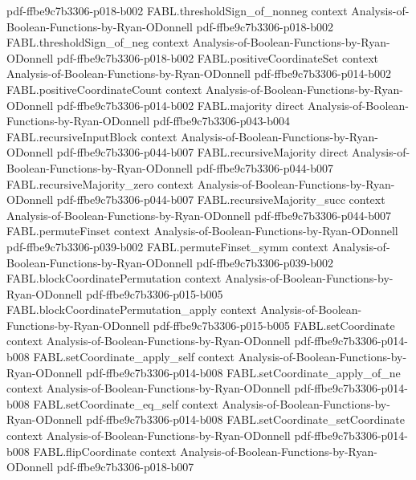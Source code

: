 \begin{theorem}
  {pdf-ffbe9c7b3306-p018-b002}
\proofstep
  {FABL.thresholdSign_of_nonneg}
  {context}
  {Analysis-of-Boolean-Functions-by-Ryan-ODonnell}
  {pdf-ffbe9c7b3306-p018-b002}
\proofstep
  {FABL.thresholdSign_of_neg}
  {context}
  {Analysis-of-Boolean-Functions-by-Ryan-ODonnell}
  {pdf-ffbe9c7b3306-p018-b002}
\proofstep
  {FABL.positiveCoordinateSet}
  {context}
  {Analysis-of-Boolean-Functions-by-Ryan-ODonnell}
  {pdf-ffbe9c7b3306-p014-b002}
\proofstep
  {FABL.positiveCoordinateCount}
  {context}
  {Analysis-of-Boolean-Functions-by-Ryan-ODonnell}
  {pdf-ffbe9c7b3306-p014-b002}
\proofstep
  {FABL.majority}
  {direct}
  {Analysis-of-Boolean-Functions-by-Ryan-ODonnell}
  {pdf-ffbe9c7b3306-p043-b004}
\proofstep
  {FABL.recursiveInputBlock}
  {context}
  {Analysis-of-Boolean-Functions-by-Ryan-ODonnell}
  {pdf-ffbe9c7b3306-p044-b007}
\proofstep
  {FABL.recursiveMajority}
  {direct}
  {Analysis-of-Boolean-Functions-by-Ryan-ODonnell}
  {pdf-ffbe9c7b3306-p044-b007}
\proofstep
  {FABL.recursiveMajority_zero}
  {context}
  {Analysis-of-Boolean-Functions-by-Ryan-ODonnell}
  {pdf-ffbe9c7b3306-p044-b007}
\proofstep
  {FABL.recursiveMajority_succ}
  {context}
  {Analysis-of-Boolean-Functions-by-Ryan-ODonnell}
  {pdf-ffbe9c7b3306-p044-b007}
\proofstep
  {FABL.permuteFinset}
  {context}
  {Analysis-of-Boolean-Functions-by-Ryan-ODonnell}
  {pdf-ffbe9c7b3306-p039-b002}
\proofstep
  {FABL.permuteFinset_symm}
  {context}
  {Analysis-of-Boolean-Functions-by-Ryan-ODonnell}
  {pdf-ffbe9c7b3306-p039-b002}
\proofstep
  {FABL.blockCoordinatePermutation}
  {context}
  {Analysis-of-Boolean-Functions-by-Ryan-ODonnell}
  {pdf-ffbe9c7b3306-p015-b005}
\proofstep
  {FABL.blockCoordinatePermutation_apply}
  {context}
  {Analysis-of-Boolean-Functions-by-Ryan-ODonnell}
  {pdf-ffbe9c7b3306-p015-b005}
\proofstep
  {FABL.setCoordinate}
  {context}
  {Analysis-of-Boolean-Functions-by-Ryan-ODonnell}
  {pdf-ffbe9c7b3306-p014-b008}
\proofstep
  {FABL.setCoordinate_apply_self}
  {context}
  {Analysis-of-Boolean-Functions-by-Ryan-ODonnell}
  {pdf-ffbe9c7b3306-p014-b008}
\proofstep
  {FABL.setCoordinate_apply_of_ne}
  {context}
  {Analysis-of-Boolean-Functions-by-Ryan-ODonnell}
  {pdf-ffbe9c7b3306-p014-b008}
\proofstep
  {FABL.setCoordinate_eq_self}
  {context}
  {Analysis-of-Boolean-Functions-by-Ryan-ODonnell}
  {pdf-ffbe9c7b3306-p014-b008}
\proofstep
  {FABL.setCoordinate_setCoordinate}
  {context}
  {Analysis-of-Boolean-Functions-by-Ryan-ODonnell}
  {pdf-ffbe9c7b3306-p014-b008}
\proofstep
  {FABL.flipCoordinate}
  {context}
  {Analysis-of-Boolean-Functions-by-Ryan-ODonnell}
  {pdf-ffbe9c7b3306-p018-b007}

\end{theorem}

